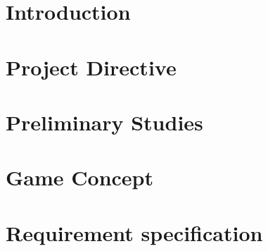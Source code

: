 \documentclass[11pt, a4paper]{article}
\begin{document}

%

\newpage

\newpage
\tableofcontents
\newpage
{}

\listoffigures

\clearpage

\listoftables

\clearpage

\section{Introduction}


\clearpage


\clearpage
\section{Project Directive}

\clearpage

\clearpage

\clearpage

\clearpage


\clearpage
\section{Preliminary Studies}


\clearpage

\clearpage

\clearpage

\clearpage


\clearpage
\section{Game Concept}



\clearpage
\section{Requirement specification}


\clearpage

\clearpage

\clearpage

\end{document}
